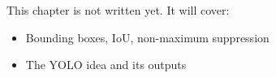 \label{ch:ai4}
\begin{keyidea}
This chapter is not written yet. It will cover:
\begin{itemize}[nosep]
  \item Bounding boxes, IoU, non-maximum suppression
  \item The YOLO idea and its outputs
\end{itemize}
\end{keyidea}
